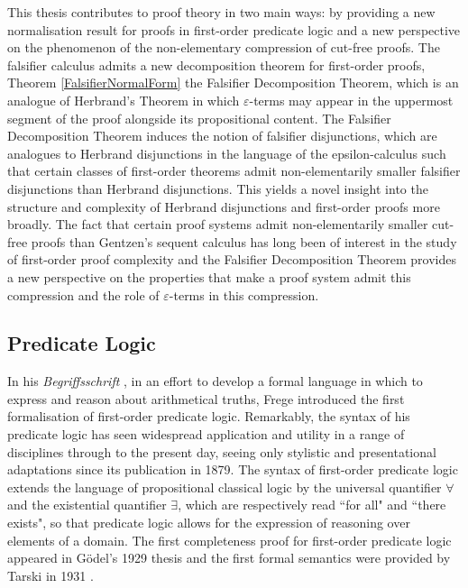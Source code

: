 \documentclass[10pt]{article}
\theoremstyle{definition}\newtheorem{remark}[theorem]{Remark}
\theoremstyle{definition}\newtheorem{example}[theorem]{Example}
\theoremstyle{definition}\newtheorem{definition}[theorem]{Definition}
\begin{document}
	This thesis contributes to proof theory in two main ways: by providing a new normalisation result for proofs in first-order predicate logic and a new perspective on the phenomenon of the non-elementary compression of cut-free proofs. The falsifier calculus admits a new decomposition theorem for first-order proofs, Theorem \ref{FalsifierNormalForm} the Falsifier Decomposition Theorem, which is an analogue of Herbrand's Theorem in which $\varepsilon$-terms may appear in the uppermost segment of the proof alongside its propositional content. The Falsifier Decomposition Theorem induces the notion of falsifier disjunctions, which are analogues to Herbrand disjunctions in the language of the epsilon-calculus such that certain classes of first-order theorems admit non-elementarily smaller falsifier disjunctions than Herbrand disjunctions. This yields a novel insight into the structure and complexity of Herbrand disjunctions and first-order proofs more broadly. The fact that certain proof systems admit non-elementarily smaller cut-free proofs than Gentzen's sequent calculus has long been of interest in the study of first-order proof complexity \cite{BaazSkolemization, BaazUnsoundInferences, BaazLolicEpsilonShorterProofs} and the Falsifier Decomposition Theorem provides a new perspective on the properties that make a proof system admit this compression and the role of $\varepsilon$-terms in this compression.
	
	\subsection{Predicate Logic}
	
	In his \textit{Begriffsschrift} \cite{FregeBegriffsschrift}, in an effort to develop a formal language in which to express and reason about arithmetical truths, Frege introduced the first formalisation of first-order predicate logic. Remarkably, the syntax of his predicate logic has seen widespread application and utility in a range of disciplines through to the present day, seeing only stylistic and presentational adaptations since its publication in 1879. The syntax of first-order predicate logic extends the language of propositional classical logic by the universal quantifier $\forall$ and the existential quantifier $\exists$, which are respectively read ``for all" and ``there exists", so that predicate logic allows for the expression of reasoning over elements of a domain. The first completeness proof for first-order predicate logic appeared in Gödel's 1929 thesis \cite{GodelCompleteness} and the first formal semantics were provided by Tarski in 1931 \cite{TarskiConceptOfTruth}.
	
\end{document}
